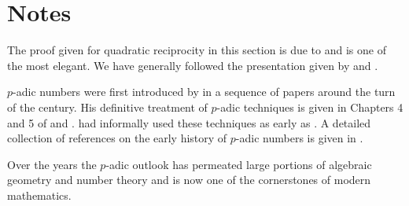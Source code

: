 \section*{Notes}

\small

 The proof given for quadratic
reciprocity in this section is due to {\Eisenstein}
\cite{Eisenstein1975-pz} and is one of the most elegant.  We have 
generally followed the presentation given by {\Ireland} and {\Rosen}
\cite{Ireland1980-um}.

 $p$-adic numbers were first
introduced by {\Hensel} in a sequence of papers
\cite{Hensel1897-wl,Hensel1902-im,Hensel1904-dt,Hensel1897-wl,Hensel1909-ju} around the turn
of the century.  His definitive treatment of $p$-adic techniques is
given in Chapters 4 and 5 of \cite{Hensel1913-gl} and \cite{Hensel1918-mx}.
{\Hensel} had informally used these techniques as early as
\cite{Hensel1887-bs,Hensel1887-bs}.  A detailed collection of references on the
early history of $p$-adic numbers is given in \cite{Dickson1967-ad}.

Over the years the $p$-adic outlook has permeated large portions of
algebraic geometry and number theory and is now one of the
cornerstones of modern mathematics.

\normalsize
